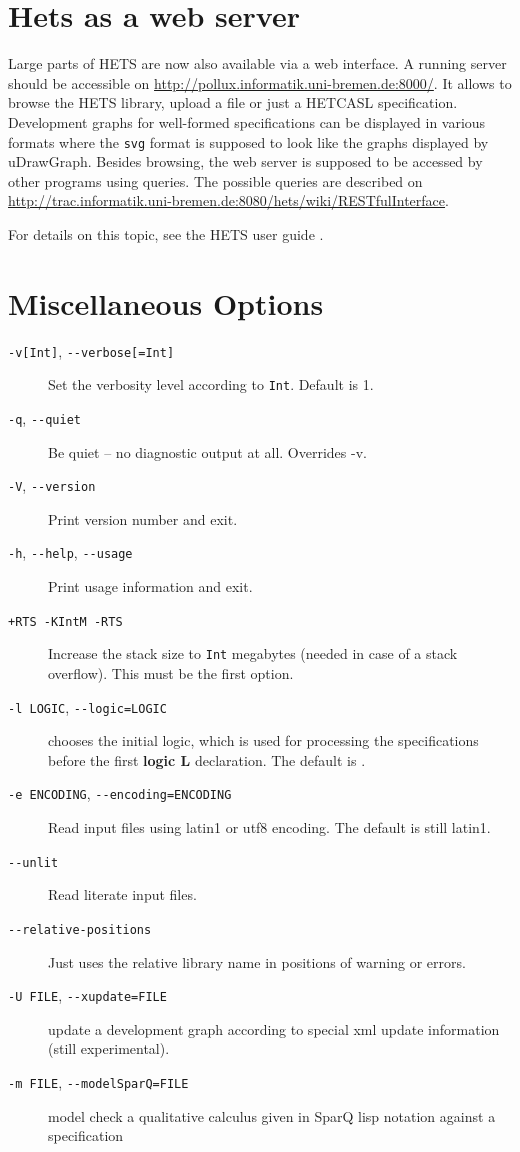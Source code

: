 \documentclass{article}
\newcommand{\normalTEXTSC}[2]{{#1\scriptsize#2}}
\newcommand     {\Hets}{\normalTEXTSC{H}{ETS}\xspace}
\newcommand{\HetCASL}{\normalTEXTSC{H}{ET}\normalTEXTSC{C}{ASL}\xspace}
\begin{document}
\section{Hets as a web server}\label{sec:Server}

Large parts of \Hets are now also available via a web interface. A running
server should be accessible on
\url{http://pollux.informatik.uni-bremen.de:8000/}. It allows to browse the
\Hets library, upload a file or just a \HetCASL specification. Development
graphs for well-formed specifications can be displayed in various formats
where the \texttt{svg} format is supposed to look like the graphs displayed by
uDrawGraph. Besides browsing, the web server is supposed to be accessed by
other programs using queries. The possible queries are described on
\url{http://trac.informatik.uni-bremen.de:8080/hets/wiki/RESTfulInterface}.

For details on this topic, see the \Hets user guide \cite{HetsUserGuide}.

\section{Miscellaneous Options}

\begin{description}
\item[\texttt{-v[Int]}, \texttt{-{}-verbose[=Int]}]
Set the verbosity level according to \texttt{Int}. Default is 1.
\item[\texttt{-q}, \texttt{-{}-quiet}]
Be quiet -- no diagnostic output at all. Overrides -v.
\item[\texttt{-V}, \texttt{-{}-version}] Print version number and exit.
\item[\texttt{-h}, \texttt{-{}-help}, \texttt{-{}-usage}]
Print usage information and exit.
\item[\texttt{+RTS -KIntM -RTS}] Increase the stack size to
 \texttt{Int} megabytes (needed in case of a stack overflow).
This must be the first option.
\item[\texttt{-l LOGIC}, \texttt{-{}-logic=LOGIC}] chooses the initial logic, which is used for processing the specifications before the first \textbf{logic L}
declaration. The default is \CASL.
\item[\texttt{-e ENCODING}, \texttt{-{}-encoding=ENCODING}] Read input files using latin1 or utf8 encoding. The default is still latin1.
\item[\texttt{-{}-unlit}] Read literate input files.
\item[\texttt{-{}-relative-positions}] Just uses the relative library name in positions of warning or errors.
\item[\texttt{-U FILE}, \texttt{-{}-xupdate=FILE}] update a development graph according to special xml update information (still experimental).
\item[\texttt{-m FILE}, \texttt{-{}-modelSparQ=FILE}] model check a qualitative calculus given in SparQ lisp notation \cite{SparQ06} against a \CASL specification
\end{description}




\end{document}
